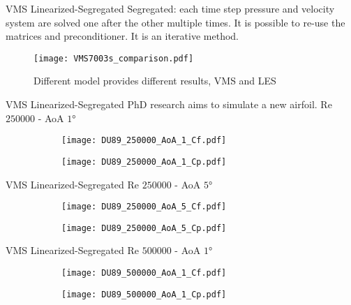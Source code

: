 \begin{frame}{VMS Linearized-Segregated}
Segregated: each time step pressure and velocity system are solved one after the other multiple times. It is possible to re-use the matrices and preconditioner. It is an iterative method.
\begin{figure}[h]
     \centering          
         \texttt{[image:  VMS7003s\_comparison.pdf]}
         \caption{Different model provides different results, VMS and LES}
     \end{figure} 
\end{frame}




\begin{frame}{VMS Linearized-Segregated}
PhD research aims to simulate a new airfoil.
Re $\num{250000}$ - AoA $\ang{1}$ 

\begin{figure}[h]
     \centering          
     \begin{subfigure}[h]{0.45\textwidth}
              \centering
         \texttt{[image: DU89\_250000\_AoA\_1\_Cf.pdf]}
    \end{subfigure}
          \hfill
     \begin{subfigure}[h]{0.45\textwidth}
      \centering
         \texttt{[image: DU89\_250000\_AoA\_1\_Cp.pdf]}
     \end{subfigure}
     \end{figure} 
 \end{frame}

\begin{frame}{VMS Linearized-Segregated}
Re $\num{250000}$ - AoA $\ang{5}$ 
\begin{figure}[h]
     \centering          
     \begin{subfigure}[h]{0.45\textwidth}
              \centering
         \texttt{[image: DU89\_250000\_AoA\_5\_Cf.pdf]}
    \end{subfigure}
          \hfill
     \begin{subfigure}[h]{0.45\textwidth}
      \centering
         \texttt{[image: DU89\_250000\_AoA\_5\_Cp.pdf]}
     \end{subfigure}
     \end{figure} 
 \end{frame}

\begin{frame}{VMS Linearized-Segregated}
Re $\num{500000}$ - AoA $\ang{1}$ 
\begin{figure}[h]
     \centering          
     \begin{subfigure}[h]{0.45\textwidth}
              \centering
         \texttt{[image: DU89\_500000\_AoA\_1\_Cf.pdf]}
    \end{subfigure}
          \hfill
     \begin{subfigure}[h]{0.45\textwidth}
      \centering
         \texttt{[image: DU89\_500000\_AoA\_1\_Cp.pdf]}
     \end{subfigure}
     \end{figure} 
 \end{frame}


